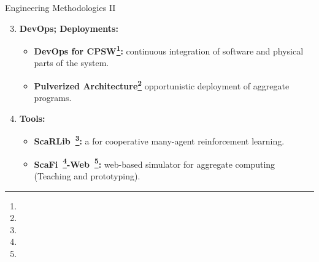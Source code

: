 \documentclass[presentation, 8pt,169]{beamer}\mode<presentation>{\usetheme{AMSBolognaFC}}
\begin{document}
\begin{frame}{Engineering Methodologies II}

  \begin{enumerate}
  \setcounter{enumi}{2}
  \item \textbf{DevOps; Deployments:}
  
  \begin{itemize}
  \item \textbf{DevOps for CPSW\footnote{}:} continuous integration of software and physical parts of the system.
  \item \textbf{Pulverized Architecture\footnote{}} opportunistic deployment of aggregate programs.
 
  \end{itemize}
  \framebreak
  \item \textbf{Tools:}
  
  \begin{itemize}
  \item \textbf{ScaRLib~\footnote{}:} a for cooperative many-agent reinforcement learning.
  \item \textbf{ScaFi~\footnote{}-Web~\footnote{}:} web-based simulator for aggregate computing (Teaching and prototyping).
  \end{itemize}
\end{enumerate}
\end{frame}
\end{document}
